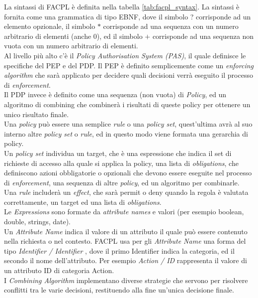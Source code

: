 La sintassi di FACPL è definita nella tabella \ref{tab:facpl_syntax}.
La sintassi è fornita come una grammatica di tipo EBNF, dove il simbolo ? corrisponde ad un elemento opzionale, il simbolo $*$ corrisponde ad una sequenza con un numero arbitrario di elementi (anche 0), ed il simbolo $+$ corrisponde ad una sequenza non vuota con un numero arbitrario di elementi.\\
Al livello più alto c'è il \textit{Policy Authorisation System (PAS)}, il quale definisce le specifiche del PEP e del PDP.
Il PEP è definito semplicemente come un \textit{enforcing algorithm} che sarà applicato per decidere quali decisioni verrà eseguito il processo di \textit{enforcement}. \\
Il PDP invece è definito come una sequenza (non vuota) di \textit{Policy}, ed un algoritmo di combining che combinerà i risultati di queste policy per ottenere un unico risultato finale.\\
Una \textit{policy} può essere una semplice \textit{rule} o una \textit{policy set}, quest'ultima avrà al suo interno altre \textit{policy set} o \textit{rule}, ed in questo modo viene formata una gerarchia di policy.\\
Un \textit{policy set} individua un target, che è una espressione che indica il set di richieste di accesso alla quale si applica la policy, una lista di \textit{obligations}, che definiscono azioni obbligatorie o opzionali che devono essere eseguite nel processo di \textit{enforcement}, una sequenza di altre \textit{policy}, ed un algoritmo per combinarle.\\
Una \textit{rule} includerà un \textit{effect}, che sarà permit o deny quando la regola è valutata correttamente, un target ed una lista di \textit{obligations}.\\
Le \textit{Expressions} sono formate da \textit{attribute names} e valori (per esempio boolean, double, strings, date).\\
Un \textit{Attribute Name} indica il valore di un attributo il quale può essere contenuto nella richiesta o nel contesto. FACPL usa per gli \textit{Attribute Name} una forma del tipo \textit{Identifier / Identifier }, dove il primo Identifier indica la categoria, ed il secondo il nome dell'attributo.
Per esempio \textit{Action / ID} rappresenta il valore di un attributo ID di categoria Action.\\
I \textit{Combining Algorithm} implementano diverse strategie che servono per risolvere conflitti tra le varie decisioni, restituendo alla fine un'unica decisione finale.\\
